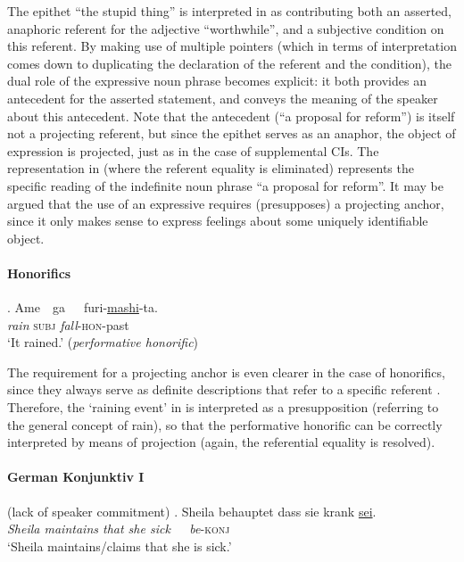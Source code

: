 \noindent The epithet ``the stupid thing'' is interpreted in \Last[a] as
contributing both an asserted, anaphoric referent for the adjective
``worthwhile'', and a subjective condition on this referent. By making use
of multiple pointers (which in terms of interpretation comes down to
duplicating the declaration of the referent and the condition), the  dual
role of the expressive noun phrase becomes explicit: it both provides an
antecedent for the asserted statement, and conveys the meaning of the
speaker about this antecedent. Note that the antecedent (``a proposal for
reform'') is itself not a projecting referent, but since the epithet serves
as an anaphor, the object of expression is projected, just as in the case of
supplemental CIs. 
The representation in \Last[b] (where the referent equality is eliminated)
represents the specific reading of the indefinite noun phrase ``a proposal
for reform''. It may be argued that the use of an expressive requires
(presupposes) a projecting anchor, since it only makes sense to express
feelings about some uniquely identifiable object. 

\noindent\parbox[b]{\textwidth}{\paragraph{Honorifics}
\ex. Ame~~ga~~~furi-\underline{mashi}-ta.\\
\textit{rain} \textsc{subj} \textit{fall}-\textsc{hon}-past\\
`It rained.' (\textit{performative honorific})\\

}

\noindent The requirement for a projecting anchor is even clearer in the
case of honorifics, since they always serve as definite descriptions that
refer to a specific referent \citep[cf.][]{potts2004japanese}. Therefore,
the `raining event' in \Last is interpreted as a presupposition (referring
to the general concept of rain), so that the performative honorific can be
correctly interpreted by means of projection (again, the referential
equality is resolved).

\noindent\parbox[b]{\textwidth}{\paragraph{German Konjunktiv I} (lack of speaker commitment)
\ex. Sheila behauptet dass sie krank \underline{sei}.\\
\textit{Sheila maintains that she sick~~~be}-\textsc{konj}\\
`Sheila maintains/claims that she is sick.'\\

}

